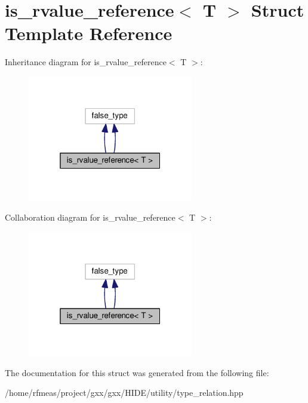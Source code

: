 \hypertarget{structis__rvalue__reference}{}\section{is\+\_\+rvalue\+\_\+reference$<$ T $>$ Struct Template Reference}
\label{structis__rvalue__reference}


Inheritance diagram for is\+\_\+rvalue\+\_\+reference$<$ T $>$\+:
\nopagebreak
\begin{figure}[H]
\begin{center}
\leavevmode
\includegraphics[width=205pt]{structis__rvalue__reference__inherit__graph}
\end{center}
\end{figure}


Collaboration diagram for is\+\_\+rvalue\+\_\+reference$<$ T $>$\+:
\nopagebreak
\begin{figure}[H]
\begin{center}
\leavevmode
\includegraphics[width=205pt]{structis__rvalue__reference__coll__graph}
\end{center}
\end{figure}


The documentation for this struct was generated from the following file\+:\begin{DoxyCompactItemize}
\item 
/home/rfmeas/project/gxx/gxx/\+H\+I\+D\+E/utility/type\+\_\+relation.\+hpp\end{DoxyCompactItemize}
